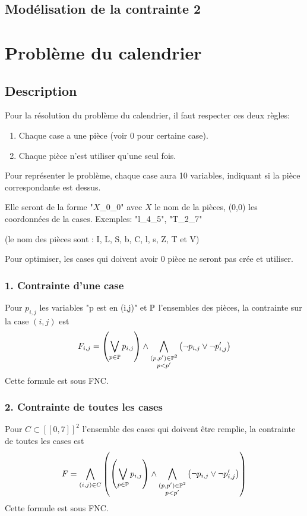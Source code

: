     \subsection{Modélisation de la contrainte 2}


    \section{Problème du calendrier}
    \subsection*{Description}
    Pour la résolution du problème du calendrier, il faut respecter ces deux règles:
    \begin{enumerate}
        \item Chaque case a une pièce (voir 0 pour certaine case).
        \item Chaque pièce n'est utiliser qu'une seul fois.
    \end{enumerate}
    
    Pour représenter le problème, chaque case aura 10 variables,
    indiquant si la pièce correspondante est dessus.
    
    Elle seront de la forme "$X$\_0\_0" avec $X$ le nom de la pièces,
    (0,0) les coordonnées de la cases.
    Exemples: "l\_4\_5", "T\_2\_7"
    
    (le nom des pièces sont : I, L, S, b, C, l, s, Z, T et V)
    
    Pour optimiser, les cases qui doivent avoir 0 pièce ne seront pas crée et utiliser.
    
    \subsubsection*{1. Contrainte d'une case}
    Pour $p_{i,j}$ les variables "p est en (i,j)" et $\mathbb{P}$ l'ensembles des pièces,
    la contrainte sur la case $(i,j)$ est
    \[F_{i,j} = \left(\bigvee_{p\in\mathbb{P}} p_{i,j} \right) \land
        \bigwedge_{\substack{(p,p')\in\mathbb{P}^2\\p<p'}}\left(\lnot p_{i,j} \lor \lnot p'_{i,j}\right)\]
    Cette formule est sous FNC.
    
    \subsubsection*{2. Contrainte de toutes les cases}
    Pour $C \subset [\![0,7]\!]^2$ l'ensemble des cases qui doivent être remplie,
    la contrainte de toutes les cases est
    \[F = \bigwedge_{(i,j)\in C} \left(\left(\bigvee_{p\in\mathbb{P}} p_{i,j} \right) \land
        \bigwedge_{\substack{(p,p')\in\mathbb{P}^2\\p<p'}}\left(\lnot p_{i,j} \lor \lnot p'_{i,j}\right)\right)\]
    Cette formule est sous FNC.
    
